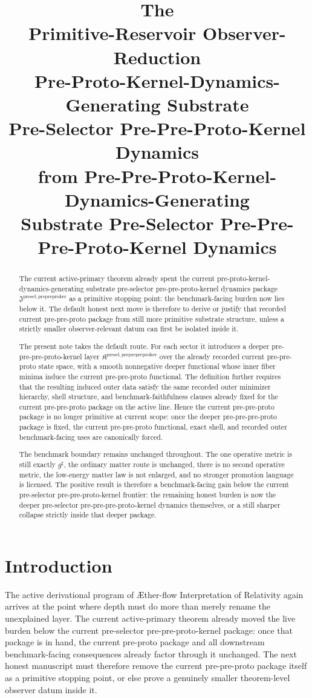 \documentclass[11pt]{article}
\title{\textbf{The \TheoryName{}}\\[0.4em]
\large Primitive-Reservoir Observer-Reduction\\
\large Pre-Proto-Kernel-Dynamics-Generating Substrate\\
\large Pre-Selector Pre-Pre-Proto-Kernel Dynamics\\
\large from Pre-Pre-Proto-Kernel-Dynamics-Generating\\
\large Substrate Pre-Selector Pre-Pre-Pre-Proto-Kernel Dynamics}
\author{}
\date{}
\newcommand{\Aflow}{\AE{}ther-flow}
\newcommand{\TheoryName}{\Aflow{} Interpretation of Relativity}
\newcommand{\CompletedMetric}{g^{\sharp}}
\newcommand{\PrePreProtoKernelPackage}{\mathfrak J^{\mathrm{presel,prepreproker}}}
\newcommand{\PrePrePreProtoKernelPackage}{\mathfrak K^{\mathrm{presel,preprepreproker}}}
\begin{document}
\maketitle

\begin{abstract}
The current active-primary theorem already spent the current pre-proto-kernel-dynamics-generating substrate pre-selector pre-pre-proto-kernel dynamics package \(\PrePreProtoKernelPackage\) as a primitive stopping point: the benchmark-facing burden now lies below it. The default honest next move is therefore to derive or justify that recorded current pre-pre-proto package from still more primitive substrate structure, unless a strictly smaller observer-relevant datum can first be isolated inside it.

The present note takes the default route. For each sector it introduces a deeper pre-pre-pre-proto-kernel layer \(\PrePrePreProtoKernelPackage\) over the already recorded current pre-pre-proto state space, with a smooth nonnegative deeper functional whose inner fiber minima induce the current pre-pre-proto functional. The definition further requires that the resulting induced outer data satisfy the same recorded outer minimizer hierarchy, shell structure, and benchmark-faithfulness clauses already fixed for the current pre-pre-proto package on the active line. Hence the current pre-pre-proto package is no longer primitive at current scope: once the deeper pre-pre-pre-proto package is fixed, the current pre-pre-proto functional, exact shell, and recorded outer benchmark-facing uses are canonically forced.

The benchmark boundary remains unchanged throughout. The one operative metric is still exactly \(\CompletedMetric\), the ordinary matter route is unchanged, there is no second operative metric, the low-energy matter law is not enlarged, and no stronger promotion language is licensed. The positive result is therefore a benchmark-facing gain below the current pre-selector pre-pre-proto-kernel frontier: the remaining honest burden is now the deeper pre-selector pre-pre-pre-proto-kernel dynamics themselves, or a still sharper collapse strictly inside that deeper package.
\end{abstract}

\section{Introduction}

The active derivational program of \TheoryName{} again arrives at the point where depth must do more than merely rename the unexplained layer. The current active-primary theorem already moved the live burden below the current pre-selector pre-pre-proto-kernel package: once that package is in hand, the current pre-proto package and all downstream benchmark-facing consequences already factor through it unchanged. The next honest manuscript must therefore remove the current pre-pre-proto package itself as a primitive stopping point, or else prove a genuinely smaller theorem-level observer datum inside it.
\end{document}
